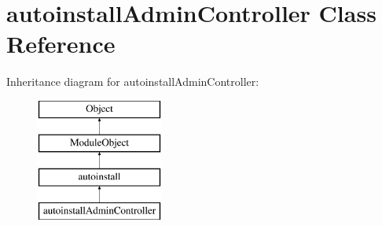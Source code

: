 \hypertarget{classautoinstallAdminController}{\section{autoinstall\+Admin\+Controller Class Reference}
\label{classautoinstallAdminController}
}
Inheritance diagram for autoinstall\+Admin\+Controller\+:\begin{figure}[H]
\begin{center}
\leavevmode
\includegraphics[height=4.000000cm]{classautoinstallAdminController}
\end{center}
\end{figure}
